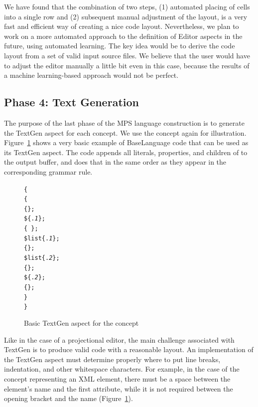 We have found that the combination of two steps, (1) automated placing of cells into a single row and (2) subsequent manual adjustment of the layout, is a very fast and efficient way of creating a nice code layout.
Nevertheless, we plan to work on a more automated approach to the definition of Editor aspects in the future, using automated learning.
The key idea would be to derive the code layout from a set of valid input source files.
We believe that the user would have to adjust the editor manually a little bit even in this case, because the results of a machine learning-based approach would not be perfect.

\subsection{Phase 4: Text Generation}
\label{sect:TEXTGENDEF}

The purpose of the last phase of the MPS language construction is to generate the TextGen aspect for each concept.
We use the  concept again for illustration.
Figure~\ref{fig:TEXTGENBASIC} shows a very basic example of BaseLanguage code that can be used as its TextGen aspect.
The code appends all literals, properties, and children of  to the output buffer, and does that in the same order as they appear in the corresponding grammar rule.

\begin{figure}[ht]
\begin{alltt}
\small
{}  \{
   \{
     \{\mpstgliteral{<}\};
     \$\{.\textit{1}\};
     \{\ \};
     \$list\{.\textit{1}\};
     \{\mpstgliteral{>}\};
     \$list\{.\textit{2}\};
     \{\mpstgliteral{</}\};
     \$\{.\textit{2}\};
     \{\mpstgliteral{>}\};
  \}
\}
\end{alltt}
\caption{Basic TextGen aspect for the  concept}
\label{fig:TEXTGENBASIC}
\end{figure}

Like in the case of a projectional editor, the main challenge associated with TextGen is to produce valid code with a reasonable layout.
An implementation of the TextGen aspect must determine properly where to put line breaks, indentation, and other whitespace characters.
For example, in the case of the concept representing an XML element, there must be a space between the element's name and the first attribute, while it is not required between the opening bracket \antlrliteral{\textless} and the name (Figure~\ref{fig:TEXTGENBASIC}).

